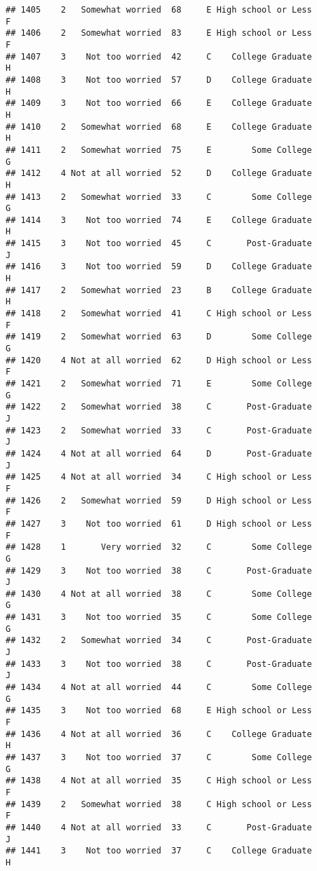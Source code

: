 \documentclass[
]{article}
\begin{document}
\begin{verbatim}
## 1405    2   Somewhat worried  68     E High school or Less         F
## 1406    2   Somewhat worried  83     E High school or Less         F
## 1407    3    Not too worried  42     C    College Graduate         H
## 1408    3    Not too worried  57     D    College Graduate         H
## 1409    3    Not too worried  66     E    College Graduate         H
## 1410    2   Somewhat worried  68     E    College Graduate         H
## 1411    2   Somewhat worried  75     E        Some College         G
## 1412    4 Not at all worried  52     D    College Graduate         H
## 1413    2   Somewhat worried  33     C        Some College         G
## 1414    3    Not too worried  74     E    College Graduate         H
## 1415    3    Not too worried  45     C       Post-Graduate         J
## 1416    3    Not too worried  59     D    College Graduate         H
## 1417    2   Somewhat worried  23     B    College Graduate         H
## 1418    2   Somewhat worried  41     C High school or Less         F
## 1419    2   Somewhat worried  63     D        Some College         G
## 1420    4 Not at all worried  62     D High school or Less         F
## 1421    2   Somewhat worried  71     E        Some College         G
## 1422    2   Somewhat worried  38     C       Post-Graduate         J
## 1423    2   Somewhat worried  33     C       Post-Graduate         J
## 1424    4 Not at all worried  64     D       Post-Graduate         J
## 1425    4 Not at all worried  34     C High school or Less         F
## 1426    2   Somewhat worried  59     D High school or Less         F
## 1427    3    Not too worried  61     D High school or Less         F
## 1428    1       Very worried  32     C        Some College         G
## 1429    3    Not too worried  38     C       Post-Graduate         J
## 1430    4 Not at all worried  38     C        Some College         G
## 1431    3    Not too worried  35     C        Some College         G
## 1432    2   Somewhat worried  34     C       Post-Graduate         J
## 1433    3    Not too worried  38     C       Post-Graduate         J
## 1434    4 Not at all worried  44     C        Some College         G
## 1435    3    Not too worried  68     E High school or Less         F
## 1436    4 Not at all worried  36     C    College Graduate         H
## 1437    3    Not too worried  37     C        Some College         G
## 1438    4 Not at all worried  35     C High school or Less         F
## 1439    2   Somewhat worried  38     C High school or Less         F
## 1440    4 Not at all worried  33     C       Post-Graduate         J
## 1441    3    Not too worried  37     C    College Graduate         H

\end{verbatim}
\end{document}
